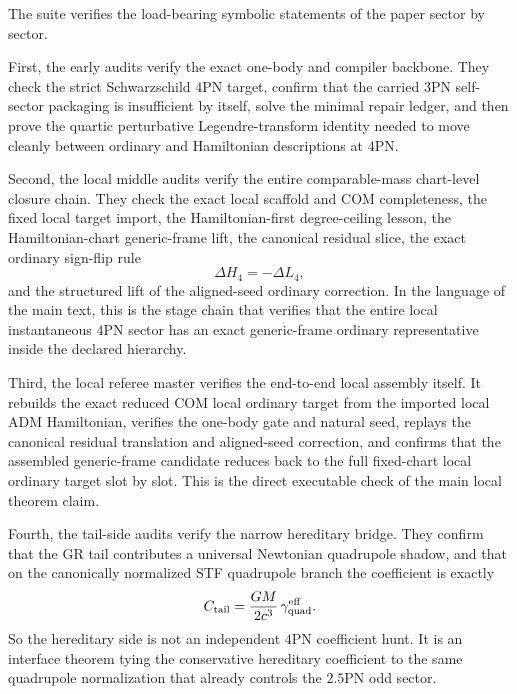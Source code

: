 \documentclass[11pt]{article}
\begin{document}
The suite verifies the load-bearing symbolic statements of the paper sector by
sector.

First, the early audits verify the exact one-body and compiler backbone.  They
check the strict Schwarzschild $4$PN target, confirm that the carried $3$PN
self-sector packaging is insufficient by itself, solve the minimal repair
ledger, and then prove the quartic perturbative Legendre-transform identity
needed to move cleanly between ordinary and Hamiltonian descriptions at $4$PN.

Second, the local middle audits verify the entire comparable-mass chart-level
closure chain.  They check the exact local scaffold and COM completeness, the
fixed local target import, the Hamiltonian-first degree-ceiling lesson, the
Hamiltonian-chart generic-frame lift, the canonical residual slice, the exact
ordinary sign-flip rule
\begin{equation}
\Delta H_4=-\Delta L_4,
\label{eq:verification-signflip-4pn}
\end{equation}
and the structured lift of the aligned-seed ordinary correction.  In the
language of the main text, this is the stage chain that verifies that the
entire local instantaneous $4$PN sector has an exact generic-frame ordinary
representative inside the declared hierarchy.

Third, the local referee master verifies the end-to-end local assembly itself.
It rebuilds the exact reduced COM local ordinary target from the imported local
ADM Hamiltonian, verifies the one-body gate and natural seed, replays the
canonical residual translation and aligned-seed correction, and confirms that
the assembled generic-frame candidate reduces back to the full fixed-chart local
ordinary target slot by slot.  This is the direct executable check of the main
local theorem claim.

Fourth, the tail-side audits verify the narrow hereditary bridge.  They confirm
that the GR tail contributes a universal Newtonian quadrupole shadow, and that
on the canonically normalized STF quadrupole branch the coefficient is exactly
\begin{equation}
C_{\rm tail}=\frac{GM}{2c^3}\,\gamma_{\rm quad}^{\rm eff}.
\label{eq:verification-tail-bridge-repeat}
\end{equation}
So the hereditary side is not an independent $4$PN coefficient hunt.  It is an
interface theorem tying the conservative hereditary coefficient to the same
quadrupole normalization that already controls the $2.5$PN odd sector.
\end{document}
